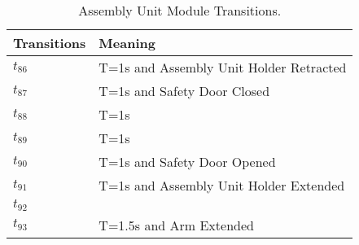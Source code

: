 \begin{table}[H]
\caption{Assembly Unit Module Transitions.}
\centering
\begin{tabular}{M{5cm}M{10cm}}
Transitions & Meaning\\
\hline
\hyperlink{partialNet:tt86}{\hypertarget{partialTable:tt86}{$t_{86}$}} & T=1s and Assembly Unit Holder Retracted\\
\hyperlink{partialNet:tt87}{\hypertarget{partialTable:tt87}{$t_{87}$}} & T=1s and Safety Door Closed\\
\hyperlink{partialNet:tt88}{\hypertarget{partialTable:tt88}{$t_{88}$}} & T=1s\\
\hyperlink{partialNet:tt89}{\hypertarget{partialTable:tt89}{$t_{89}$}} & T=1s\\
\hyperlink{partialNet:tt90}{\hypertarget{partialTable:tt90}{$t_{90}$}} & T=1s and Safety Door Opened\\
\hyperlink{partialNet:tt91}{\hypertarget{partialTable:tt91}{$t_{91}$}} & T=1s and Assembly Unit Holder Extended\\
\hyperlink{partialNet:t92}{\hypertarget{partialTable:t92}{$t_{92}$}} & \\
\hyperlink{partialNet:tt93}{\hypertarget{partialTable:tt93}{$t_{93}$}} & T=1.5s and Arm Extended\\
\end{tabular}
\end{table}
